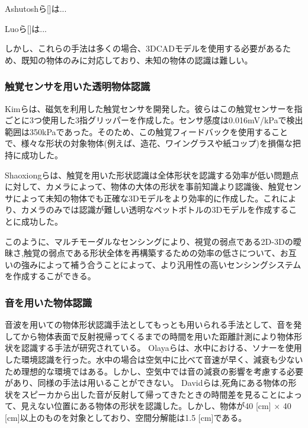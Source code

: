 Ashutoshら[]は...

Luoら[]は...
\fi

しかし、これらの手法は多くの場合、3DCADモデルを使用する必要があるため、既知の物体のみに対応しており、未知の物体の認識は難しい。

\subsubsection{触覚センサを用いた透明物体認識}
\label{sec:related_work_tactile}
Kimら\cite{kim2018tactilesensor}は、磁気を利用した触覚センサを開発した。彼らはこの触覚センサーを指ごとに3つ使用した3指グリッパーを作成した。センサ感度は0.016mV/kPaで検出範囲は350kPaであった。そのため、この触覚フィードバックを使用することで、様々な形状の対象物体(例えば、造花、ワイングラスや紙コップ)を損傷な把持に成功した。

Shaoxiongら\cite{wang2018tactilesensor}は、触覚を用いた形状認識は全体形状を認識する効率が低い問題点に対して、カメラによって、物体の大体の形状を事前知識より認識後、触覚センサによって未知の物体でも正確な3Dモデルをより効率的に作成した。これにより、カメラのみでは認識が難しい透明なペットボトルの3Dモデルを作成することに成功した。


このように、マルチモーダルなセンシングにより、視覚の弱点である2D-3Dの曖昧さ,触覚の弱点である形状全体を再構築するための効率の低さについて、お互いの強みによって補う合うことによって、より汎用性の高いセンシングシステムを作成するこができる。

\subsubsection{音を用いた物体認識}
\label{sec:related_work_sound}
音波を用いての物体形状認識手法としてもっとも用いられる手法として、音を発してから物体表面で反射視帰ってくるまでの時間を用いた距離計測により物体形状を認識する手法が研究されている。
Olayaら\cite{oday2018underwatersonar}は、水中における、ソナーを使用した環境認識を行った。水中の場合は空気中に比べて音速が早く、減衰も少ないため理想的な環境ではある。しかし、空気中では音の減衰の影響を考慮する必要があり、同様の手法は用いることができない。
Davidら\cite{david2019nlossoundimaging}は,死角にある物体の形状をスピーカから出した音が反射して帰ってきたときの時間差を見ることによって、見えない位置にある物体の形状を認識した。しかし、物体が40 [cm] $\times$ 40 [cm]以上のものを対象としており、空間分解能は1.5 [cm]である。

